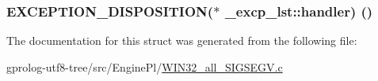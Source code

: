 \subsubsection[{\texorpdfstring{handler}{handler}}]{\setlength{\rightskip}{0pt plus 5cm}E\+X\+C\+E\+P\+T\+I\+O\+N\+\_\+\+D\+I\+S\+P\+O\+S\+I\+T\+I\+ON($\ast$ \+\_\+excp\+\_\+lst\+::handler) ()}\hypertarget{struct__excp__lst_a1e1e0c071255497025a22a693efc487c}{}\label{struct__excp__lst_a1e1e0c071255497025a22a693efc487c}


The documentation for this struct was generated from the following file\+:\begin{DoxyCompactItemize}
\item 
gprolog-\/utf8-\/tree/src/\+Engine\+Pl/\hyperlink{WIN32__all__SIGSEGV_8c}{W\+I\+N32\+\_\+all\+\_\+\+S\+I\+G\+S\+E\+G\+V.\+c}\end{DoxyCompactItemize}
